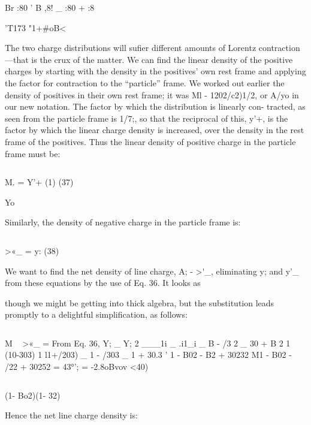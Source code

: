Br :80 ' B ,8! _ :80 + :8 

'T173 "1+#oB<

The two charge distributions will sufier different amounts of
Lorentz contraction---that is the crux of the matter. We can find the
linear density of the positive charges by starting with the density in
the positives' own rest frame and applying the factor for contraction
to the ``particle'' frame. We worked out earlier the density of positives
in their own rest frame; it was Ml - 1202/c2)1/2, or A/yo in our
new notation. The factor by which the distribution is linearly con-
tracted, as seen from the particle frame is 1/7;, so that the reciprocal
of this, y'+, is the factor by which the linear charge density is increased,
over the density in the rest frame of the positives. Thus the linear
density of positive charge in the particle frame must be:

\begin{equation}
\end{equation}

M. = Y'+ (1) (37)

Yo

Similarly, the density of negative charge in the particle frame is:

\begin{equation}
\end{equation}

>«_ = y:  (38)

We want to find the net density of line charge, A; - >\'_, eliminating
y; and y'_ from these equations by the use of Eq. 36. It looks as

 

though we might be getting into thick algebra, but the substitution
leads promptly to a delightful simplification, as follows:

\begin{equation}
\end{equation}

M ~ >«_ = %
From Eq. 36,
Y; _ Y; 2 ___1i _ .i1_i
_ B - /3 2 _ 30 + B 2
1 (10-303) \/1 l1+/203)
_ 1 - /303 _ 1 + 30.3
' \/1 - B02 - B2 + 30232 M1 - B02 - /22 + 30252
= 43°'; = -2.8oBvov <40)

\begin{equation}
\end{equation}

\/(1- Bo2)(1- 32)

Hence the net line charge density is:

\begin{equation}
\end{equation}

